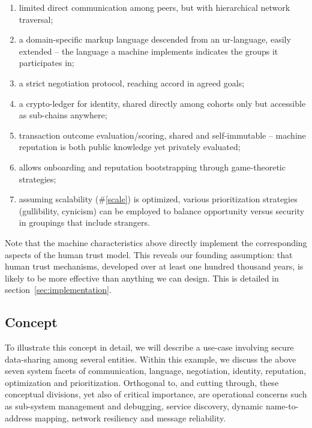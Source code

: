 \begin{enumerate}
	\item limited direct communication among peers, but with hierarchical network traversal;
	\item a domain-specific markup language descended from an ur-language, easily extended -- the language a machine implements indicates the groups it participates in;
	\item a strict negotiation protocol, reaching accord in agreed goals;
	\item a crypto-ledger for identity, shared directly among cohorts only but accessible as sub-chains anywhere;
	\item transaction outcome evaluation/scoring, shared and self-immutable -- machine reputation is both public knowledge yet privately evaluated;
	\item allows onboarding and reputation bootstrapping through game-theoretic strategies;
	\item assuming scalability (\#\ref{scale}) is optimized, various prioritization strategies (gullibility, cynicism) can be employed to balance opportunity versus security in groupings that include strangers.
\end{enumerate}
Note that the machine characteristics above directly implement the corresponding aspects of the human trust model.
This reveals our founding assumption: that human trust mechanisms, developed over at least one hundred thousand years, is likely to be more effective than anything we can design.
This is detailed in section~\ref{sec:implementation}.


\subsection{Concept}\label{subsec:concept}



To illustrate this concept in detail, we will describe a use-case involving secure data-sharing among several entities.
Within this example, we discuss the above seven system facets of communication, language, negotiation, identity, reputation, optimization and prioritization.
Orthogonal to, and cutting through, these conceptual divisions, yet also of critical importance, are operational concerns such as sub-system management and debugging, service discovery, dynamic name-to-address mapping, network resiliency and message reliability.
